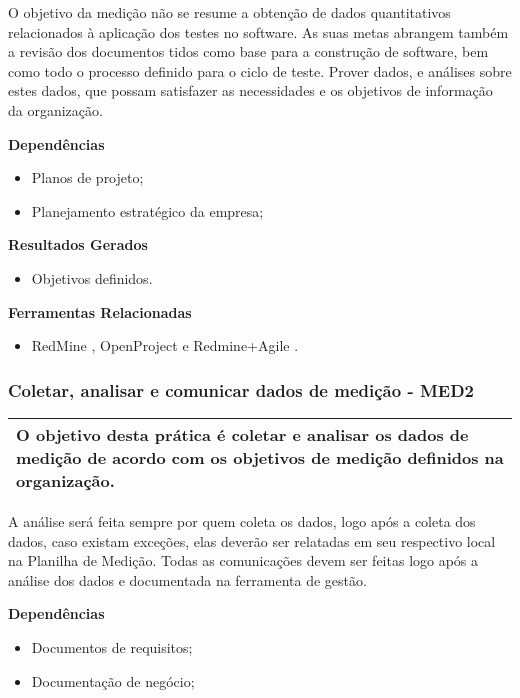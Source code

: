 O objetivo da medição não se resume a obtenção de dados quantitativos relacionados à aplicação dos testes no software. As suas metas abrangem também a revisão dos documentos tidos como base para a construção de software, bem como todo o processo definido para o ciclo de teste. Prover dados, e análises sobre estes dados, que possam satisfazer as necessidades e os objetivos de informação da organização.

\textbf{ Dependências}
\begin{itemize}
    \item Planos de projeto;
    \item Planejamento estratégico da empresa;
\end{itemize}

\textbf{Resultados Gerados }
\begin{itemize}
    \item Objetivos definidos.
\end{itemize}

\textbf{Ferramentas Relacionadas }
\begin{itemize}
    \item RedMine \cite{Redmine}, OpenProject \cite{OpenProject} e Redmine+Agile \cite{RedmineUP}.
\end{itemize}

\subsubsection{Coletar, analisar e comunicar dados de medição - MED2}
\label{sec:med2}

\begin{table}[H]
\centering
\begin{tabular}{|p{130mm}|}
\hline
O objetivo desta prática é coletar e analisar os dados de medição de acordo com os objetivos de medição definidos na organização. \\ 
\hline
\end{tabular}
\end{table}

A análise será feita sempre por quem coleta os dados, logo após a coleta dos dados, caso existam exceções, elas deverão ser relatadas em seu respectivo local na Planilha de Medição. Todas as comunicações devem ser feitas logo após a análise dos dados e documentada na ferramenta de gestão.

\textbf{Dependências}
\begin{itemize}
    \item Documentos de requisitos;
    \item Documentação de negócio;
\end{itemize}


